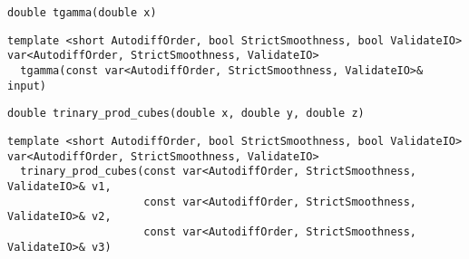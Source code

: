 \begin{tcolorbox}[colback=white,colframe=gray90, coltitle=black,boxrule=3pt,
fonttitle=\bfseries,title= Tgamma]

\begin{verbatim}
double tgamma(double x)

\end{verbatim}

\begin{verbatim}
template <short AutodiffOrder, bool StrictSmoothness, bool ValidateIO>
var<AutodiffOrder, StrictSmoothness, ValidateIO>
  tgamma(const var<AutodiffOrder, StrictSmoothness, ValidateIO>& input)

\end{verbatim}

\end{tcolorbox}

\begin{tcolorbox}[colback=white,colframe=gray90, coltitle=black,boxrule=3pt,
fonttitle=\bfseries,title= Trinary Prod Cubes]

\begin{verbatim}
double trinary_prod_cubes(double x, double y, double z)

\end{verbatim}

\begin{verbatim}
template <short AutodiffOrder, bool StrictSmoothness, bool ValidateIO>
var<AutodiffOrder, StrictSmoothness, ValidateIO>
  trinary_prod_cubes(const var<AutodiffOrder, StrictSmoothness, ValidateIO>& v1,
                     const var<AutodiffOrder, StrictSmoothness, ValidateIO>& v2,
                     const var<AutodiffOrder, StrictSmoothness, ValidateIO>& v3)

\end{verbatim}

\end{tcolorbox}

